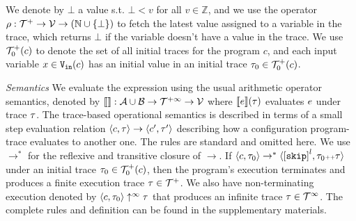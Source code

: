 %
We denote by $\bot$ a value s.t. $\bot < v $ for all $v \in \mathbb{Z}$, and we use the operator $\rho: {\mathcal{T}^{+}} \to \mathcal{V} \to(\mathbb{N} \cup \{\bot\})$  to fetch the latest value assigned to a variable in the trace, which returns $\bot$ if the variable doesn't have a value in the trace.
We use $\mathcal{T}^{+}_0(c)$ to denote the set of all initial traces for the program $c$, and each input variable $x \in {\ensuremath{\mathtt{V_{\mathtt{in}}}}}(c)$ has an initial value in an initial trace $\mathtt{\tau}_0 \in \mathcal{T}^{+}_0(c)$.\\

\emph{Semantics}
We evaluate the expression using the usual arithmetic operator semantics, denoted by
$\llbracket  \rrbracket : \mathcal{A} \cup \mathcal{B} \to \mathcal{T}^{+\infty} \to \mathcal{V}$ where
$\llbracket e \rrbracket(\mathtt{\tau})$ evaluates $e$ under trace $\mathtt{\tau}$.
The trace-based operational semantics is described in terms of a small step evaluation relation $\langle c, \mathtt{\tau} \rangle \to \langle c', \mathtt{\tau}' \rangle$ describing how a configuration program-trace evaluates to another
one.
The rules are standard and omitted here.
We use $\to^*$ for the reflexive and transitive closure of $\to$. 
If $\config{c, \trace_0} \rightarrow^{*} \config{\clabel{\eskip}^l, \trace_0 \tracecat \trace}$ under an initial trace 
$\mathtt{\tau}_0 \in \mathcal{T}^{+}_0(c)$,
then the program's execution terminates and produces a finite execution trace $\mathtt{\tau} \in \mathcal{T}^{+}$. We also have non-terminating execution denoted by $\langle c, \mathtt{\tau}_0 \rangle \uparrow^{\infty} \mathtt{\tau}$ that produces an infinite trace $\mathtt{\tau} \in \mathcal{T}^{\infty}$. The complete rules and definition can be found in the supplementary materials.
